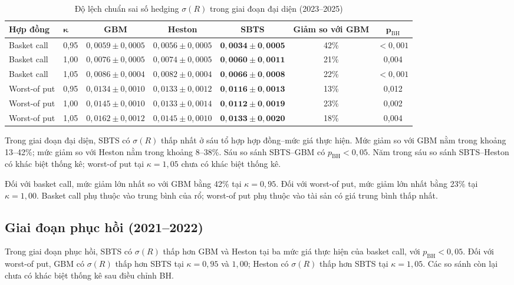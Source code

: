 \begin{table}[H]
\centering
\scriptsize
\setlength{\tabcolsep}{3pt}
\caption{Độ lệch chuẩn sai số hedging $\sigma(R)$ trong giai đoạn đại diện (2023--2025)}
\label{tab:c4-recent-main}
\begin{tabular}{@{}llccccc@{}}
\toprule
\textbf{Hợp đồng} & $\boldsymbol\kappa$ & \textbf{GBM} & \textbf{Heston} &
\textbf{SBTS} & \textbf{Giảm so với GBM} & $\boldsymbol p_{\mathrm{BH}}$\\
\midrule
Basket call & 0,95 & $0,0059\pm0,0005$ & $0,0056\pm0,0005$ &
$\mathbf{0,0034\pm0,0005}$ & 42\% & $<0,001$\\
Basket call & 1,00 & $0,0076\pm0,0005$ & $0,0074\pm0,0005$ &
$\mathbf{0,0060\pm0,0011}$ & 21\% & 0,004\\
Basket call & 1,05 & $0,0086\pm0,0004$ & $0,0082\pm0,0004$ &
$\mathbf{0,0066\pm0,0008}$ & 22\% & $<0,001$\\
\midrule
Worst-of put & 0,95 & $0,0134\pm0,0010$ & $0,0133\pm0,0012$ &
$\mathbf{0,0116\pm0,0013}$ & 13\% & 0,012\\
Worst-of put & 1,00 & $0,0145\pm0,0010$ & $0,0133\pm0,0014$ &
$\mathbf{0,0112\pm0,0019}$ & 23\% & 0,002\\
Worst-of put & 1,05 & $0,0162\pm0,0012$ & $0,0145\pm0,0010$ &
$\mathbf{0,0133\pm0,0020}$ & 18\% & 0,004\\
\bottomrule
\end{tabular}
\end{table}

Trong giai đoạn đại diện, SBTS có $\sigma(R)$ thấp nhất ở sáu tổ hợp hợp đồng--mức giá thực
hiện. Mức giảm so với GBM nằm trong khoảng 13--42\%; mức giảm so với Heston
nằm trong khoảng 8--38\%. Sáu so sánh SBTS--GBM có
$p_{\mathrm{BH}}<0{,}05$. Năm trong sáu so sánh SBTS--Heston có khác biệt
thống kê; worst-of put tại $\kappa=1{,}05$ chưa có khác biệt thống kê.

Đối với basket call, mức giảm lớn nhất so với GBM bằng 42\% tại
$\kappa=0{,}95$. Đối với worst-of put, mức giảm lớn nhất bằng 23\% tại
$\kappa=1{,}00$. Basket call phụ thuộc vào trung bình của rổ; worst-of put phụ
thuộc vào tài sản có giá trung bình thấp nhất.

\subsection{Giai đoạn phục hồi (2021--2022)}

Trong giai đoạn phục hồi, SBTS có $\sigma(R)$ thấp hơn GBM và Heston tại ba mức giá
thực hiện của basket call, với $p_{\mathrm{BH}}<0{,}05$. Đối với worst-of put,
GBM có $\sigma(R)$ thấp hơn SBTS tại $\kappa=0{,}95$ và $1{,}00$; Heston có
$\sigma(R)$ thấp hơn SBTS tại $\kappa=1{,}05$. Các so sánh còn lại chưa có
khác biệt thống kê sau điều chỉnh BH.

